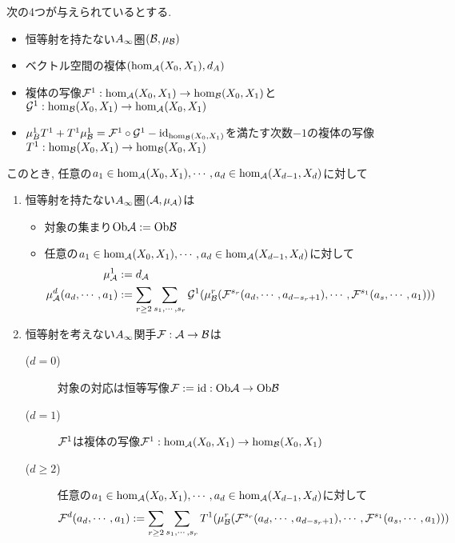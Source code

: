 \documentclass[uplatex, a4paper, 14Q, dvipdfmx]{jsarticle}
\begin{document}
\begin{theorem}[ホモロジー的摂動論] \label{prop_homological_perturbation}
  次の4つが与えられているとする. 
  \begin{itemize}
    \item 恒等射を持たない$A_{\infty}$圏$(\mathcal{B},\mu_{\mathcal{B}})$
    \item ベクトル空間の複体$(\hom_{\mathcal{A}}(X_0,X_1),d_A)$ 
    \item 複体の写像$\mathcal{F}^1 : \hom_{\mathcal{A}}(X_0,X_1) \to \hom_{\mathcal{B}}(X_0,X_1)$と$\mathcal{G}^1 : \hom_{\mathcal{B}}(X_0,X_1) \to \hom_{\mathcal{A}}(X_0,X_1)$
    \item $\mu^1_B T^1+ T^1 \mu^1_{\mathcal{B}} = \mathcal{F}^1 \circ \mathcal{G}^1 - \mathrm{id}_{\hom_{\mathcal{B}}(X_0,X_1)}$を満たす次数$-1$の複体の写像$T^1 : \hom_{\mathcal{B}}(X_0,X_1) \to \hom_{\mathcal{B}}(X_0,X_1)$
  \end{itemize}
  このとき, 任意の$a_1 \in \hom_{\mathcal{A}}(X_0,X_1), \cdots, a_d \in \hom_{\mathcal{A}}(X_{d-1},X_d)$に対して
  \begin{enumerate}
    \item 恒等射を持たない$A_{\infty}$圏$(\mathcal{A},\mu_{\mathcal{A}})$は
    \begin{itemize}
      \item 対象の集まり$\mathrm{Ob}\mathcal{A} := \mathrm{Ob}\mathcal{B}$
      \item 任意の$a_1 \in \hom_{\mathcal{A}}(X_0,X_1), \cdots, a_d \in \hom_{\mathcal{A}}(X_{d-1},X_d)$に対して
      \begin{align*}
        \mu^1_{\mathcal{A}} 
        &:= d_{\mathcal{A}} \\
        \mu^d_{\mathcal{A}}(a_d,\cdots,a_1)
        &:= \sum_{r \geq 2} \sum_{s_1,\cdots,s_r} \mathcal{G}^1(\mu^r_{\mathcal{B}}(\mathcal{F}^{s_r}(a_d,\cdots,a_{d-s_r+1}), \cdots, \mathcal{F}^{s_1}(a_s,\cdots,a_1)))
      \end{align*}
    \end{itemize}
    \item 恒等射を考えない$A_{\infty}$関手$\mathcal{F} : \mathcal{A} \to \mathcal{B}$は
    \begin{description}
      \item[($d=0$)] 対象の対応は恒等写像$\mathcal{F} := \mathrm{id} : \mathrm{Ob}\mathcal{A} \to \mathrm{Ob}\mathcal{B}$
      \item[($d=1$)] $\mathcal{F}^1$は複体の写像$\mathcal{F}^1 : \hom_{\mathcal{A}}(X_0,X_1) \to \hom_{\mathcal{B}}(X_0,X_1)$
      \item[($d \geq 2$)] 任意の$a_1 \in \hom_{\mathcal{A}}(X_0,X_1), \cdots, a_d \in \hom_{\mathcal{A}}(X_{d-1},X_d)$に対して
      \begin{align*}
        \mathcal{F}^d(a_d,\cdots,a_1)
        := \sum_{r \geq 2} \sum_{s_1,\cdots,s_r} T^1(\mu^r_{\mathcal{B}}(\mathcal{F}^{s_r}(a_d,\cdots,a_{d-s_r+1}), \cdots, \mathcal{F}^{s_1}(a_s,\cdots,a_1)))
      \end{align*}
    \end{description}

\end{enumerate}
\end{theorem}
\end{document}
